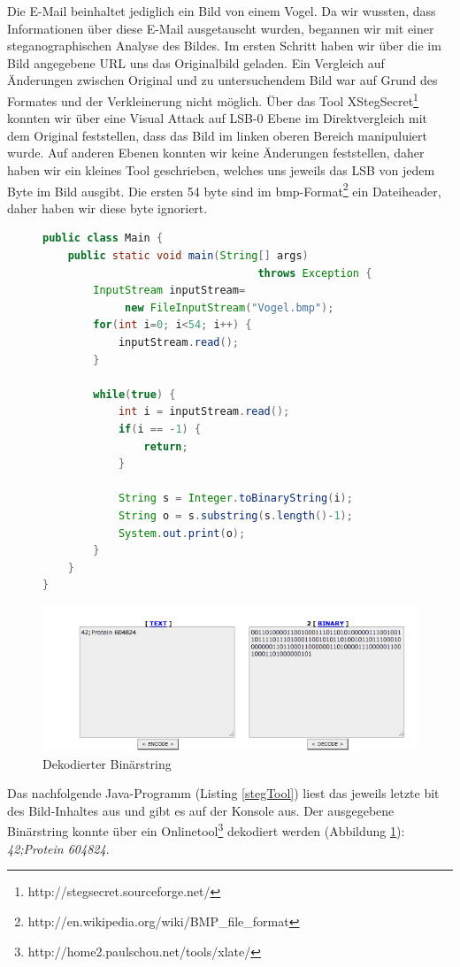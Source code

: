 \documentclass[12pt]{article}
\begin{document}
Die E-Mail beinhaltet jediglich ein Bild von einem Vogel. Da wir wussten, dass Informationen über diese E-Mail ausgetauscht wurden, begannen wir mit einer steganographischen Analyse des Bildes. Im ersten Schritt haben wir über die im Bild angegebene URL uns das Originalbild geladen. Ein Vergleich auf Änderungen zwischen Original und zu untersuchendem Bild war auf Grund des Formates und der Verkleinerung nicht möglich. Über das Tool XStegSecret\footnote{http://stegsecret.sourceforge.net/} konnten wir über eine Visual Attack auf LSB-0 Ebene im Direktvergleich mit dem Original feststellen, dass das Bild im linken oberen Bereich manipuluiert wurde. Auf anderen Ebenen konnten wir keine Änderungen feststellen, daher haben wir ein kleines Tool geschrieben, welches uns jeweils das LSB von jedem Byte im Bild ausgibt. Die ersten 54 byte sind im bmp-Format\footnote{http://en.wikipedia.org/wiki/BMP\_file\_format} ein Dateiheader, daher haben wir diese byte ignoriert.
\begin{figure}
\begin{lstlisting}[language=Java,caption={Java-Programm zur Ausgabe des versteckten Textes},label=stegTool,basicstyle=\footnotesize]
public class Main {
    public static void main(String[] args) 
                                  throws Exception {
        InputStream inputStream= 
             new FileInputStream("Vogel.bmp");
        for(int i=0; i<54; i++) {
            inputStream.read();
        }

        while(true) {
            int i = inputStream.read();
            if(i == -1) {
                return;
            }

            String s = Integer.toBinaryString(i);
            String o = s.substring(s.length()-1);
            System.out.print(o);
        }
    }
}
\end{lstlisting}
\end{figure}
 \begin{figure}
  \begin{center}
    \includegraphics[scale=0.6]{images/stegResult.png}
  \end{center}
  \caption{Dekodierter Binärstring}
  \label{stegResult}
\end{figure}
Das nachfolgende Java-Programm (Listing \ref{stegTool}) liest das jeweils letzte bit des Bild-Inhaltes aus und gibt es auf der Konsole aus. Der ausgegebene Binärstring konnte über ein Onlinetool\footnote{http://home2.paulschou.net/tools/xlate/} dekodiert werden (Abbildung \ref{stegResult}): \textit{42;Protein 604824}. 
\end{document}
